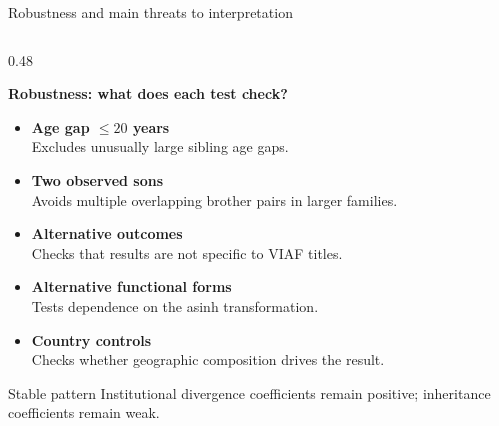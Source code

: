 \documentclass[aspectratio=169,10pt]{beamer}
\begin{document}
\begin{frame}{Robustness and main threats to interpretation}

\small

\begin{columns}[T,onlytextwidth]

\begin{column}{0.48\textwidth}

\textbf{Robustness: what does each test check?}

\vspace{0.10em}

\begin{itemize}
    \setlength{\itemsep}{0.22em}

    \item \textbf{Age gap $\leq 20$ years}\\[-0.08em]
    {\scriptsize Excludes unusually large sibling age gaps.}

    \item \textbf{Two observed sons}\\[-0.08em]
    {\scriptsize Avoids multiple overlapping brother pairs in larger families.}

    \item \textbf{Alternative outcomes}\\[-0.08em]
    {\scriptsize Checks that results are not specific to VIAF titles.}

    \item \textbf{Alternative functional forms}\\[-0.08em]
    {\scriptsize Tests dependence on the asinh transformation.}

    \item \textbf{Country controls}\\[-0.08em]
    {\scriptsize Checks whether geographic composition drives the result.}

\end{itemize}

\vspace{0.10em}

\begin{block}{Stable pattern}
\scriptsize
Institutional divergence coefficients remain positive;
inheritance coefficients remain weak.
\end{block}

\end{column}


\end{columns}
\end{frame}
\end{document}
